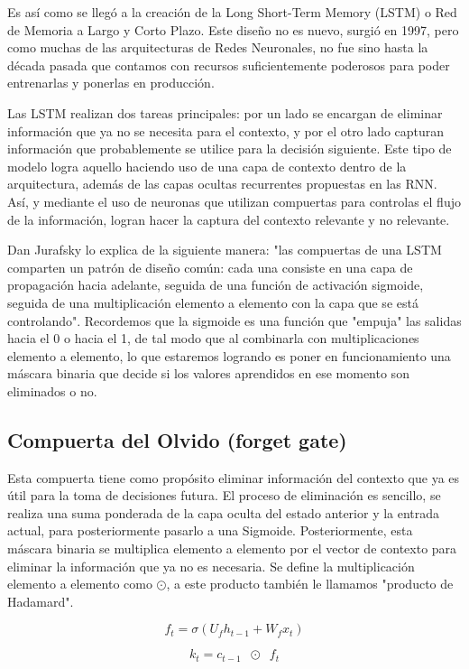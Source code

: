 Es así como se llegó a la creación de la Long Short-Term Memory (LSTM) o Red de Memoria a Largo y Corto Plazo. Este diseño no es nuevo, surgió en 1997, pero como muchas de las arquitecturas de Redes Neuronales, no fue sino hasta la década pasada que contamos con recursos suficientemente poderosos para poder entrenarlas y ponerlas en producción. 

Las LSTM realizan dos tareas principales: por un lado se encargan de eliminar información que ya no se necesita para el contexto, y por el otro lado capturan información que probablemente se utilice para la decisión siguiente. Este tipo de modelo logra aquello haciendo uso de una capa de contexto dentro de la arquitectura, además de las capas ocultas recurrentes propuestas en las RNN. Así, y mediante el uso de neuronas que utilizan compuertas para controlas el flujo de la información, logran hacer la captura del contexto relevante y no relevante. 

Dan Jurafsky lo explica de la siguiente manera: "las compuertas de una LSTM comparten un patrón de diseño común: cada una consiste en una capa de propagación hacia adelante, seguida de una función de activación sigmoide, seguida de una multiplicación elemento a elemento con la capa que se está controlando". Recordemos que la sigmoide es una función que "empuja" las salidas hacia el 0 o hacia el 1, de tal modo que al combinarla con multiplicaciones elemento a elemento, lo que estaremos logrando es poner en funcionamiento una máscara binaria que decide si los valores aprendidos en ese momento son eliminados o no. 

\subsection{Compuerta del Olvido (forget gate)}

Esta compuerta tiene como propósito eliminar información del contexto que ya es útil para la toma de decisiones futura. El proceso de eliminación es sencillo, se realiza una suma ponderada de la capa oculta del estado anterior y la entrada actual, para posteriormente pasarlo a una Sigmoide. Posteriormente, esta máscara binaria se multiplica elemento a elemento por el vector de contexto para eliminar la información que ya no es necesaria. Se define la multiplicación elemento a elemento como $\odot$, a este producto también le llamamos "producto de Hadamard". 

\[
   f_t = \sigma(U_f h_{t-1} + W_f x_t) 
\]

\[
    k_t = c_{t-1} \;\; \odot \;\; f_t 
\]

